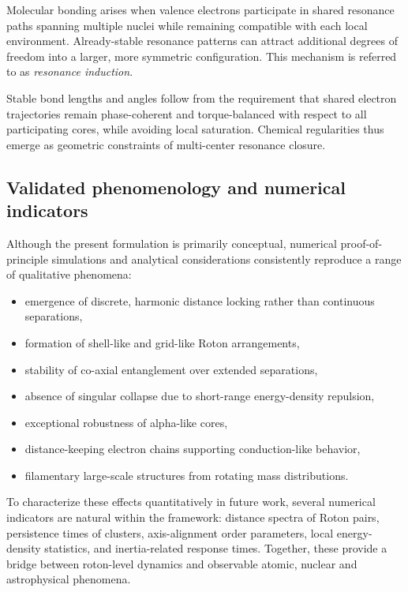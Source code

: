 \documentclass[11pt,a4paper]{article}
\begin{document}
Molecular bonding arises when valence electrons participate in shared resonance paths
spanning multiple nuclei while remaining compatible with each local environment.
Already-stable resonance patterns can attract additional degrees of freedom into a larger,
more symmetric configuration. This mechanism is referred to as \emph{resonance induction}.

Stable bond lengths and angles follow from the requirement that shared electron trajectories
remain phase-coherent and torque-balanced with respect to all participating cores, while
avoiding local saturation. Chemical regularities thus emerge as geometric constraints of
multi-center resonance closure.

\subsection{Validated phenomenology and numerical indicators}

Although the present formulation is primarily conceptual, numerical proof-of-principle
simulations and analytical considerations consistently reproduce a range of qualitative
phenomena:

\begin{itemize}
  \item emergence of discrete, harmonic distance locking rather than continuous separations,
  \item formation of shell-like and grid-like Roton arrangements,
  \item stability of co-axial entanglement over extended separations,
  \item absence of singular collapse due to short-range energy-density repulsion,
  \item exceptional robustness of alpha-like cores,
  \item distance-keeping electron chains supporting conduction-like behavior,
  \item filamentary large-scale structures from rotating mass distributions.
\end{itemize}

To characterize these effects quantitatively in future work, several numerical indicators
are natural within the framework: distance spectra of Roton pairs, persistence times of
clusters, axis-alignment order parameters, local energy-density statistics, and inertia-related
response times. Together, these provide a bridge between roton-level dynamics and observable
atomic, nuclear and astrophysical phenomena.
\end{document}
